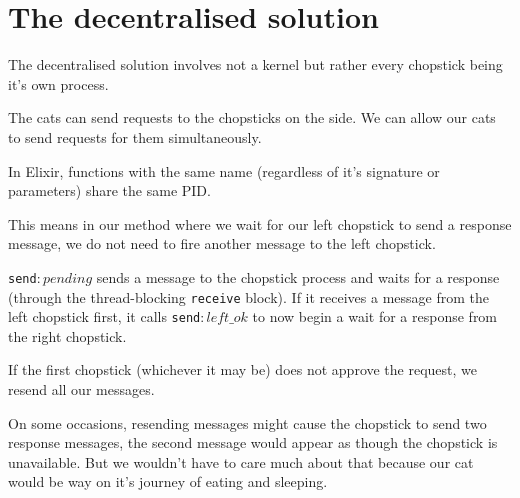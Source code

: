 \section{The decentralised solution}
The decentralised solution involves not a kernel but rather every chopstick being it's own process.

The cats can send requests to the chopsticks on the side.
We can allow our cats to send requests for them simultaneously. 

In Elixir, functions with the same name (regardless of it's signature or parameters) share the same PID\@.

This means in our method where we wait for our left chopstick to send a response message, we do not need to fire another message to the left chopstick.

\texttt{send\(:pending\)} sends a message to the chopstick process and waits for a response (through the thread-blocking \texttt{receive} block). If it receives a message from the left chopstick first, it calls \texttt{send\(:left\_ok\)} to now begin a wait for a response from the right chopstick. 

If the first chopstick (whichever it may be) does not approve the request, we resend all our messages.

On some occasions, resending messages might cause the chopstick to send two response messages, the second message would appear as though the chopstick is unavailable. But we wouldn't have to care much about that because our cat would be way on it's journey of eating and sleeping.

